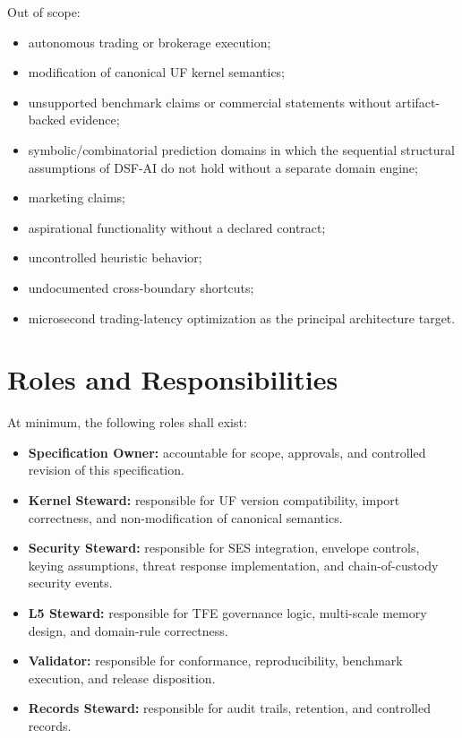 Out of scope:
\begin{itemize}
    \item autonomous trading or brokerage execution;
    \item modification of canonical UF kernel semantics;
    \item unsupported benchmark claims or commercial statements without artifact-backed evidence;
    \item symbolic/combinatorial prediction domains in which the sequential structural assumptions of DSF-AI do not hold without a separate domain engine;
    \item marketing claims;
    \item aspirational functionality without a declared contract;
    \item uncontrolled heuristic behavior;
    \item undocumented cross-boundary shortcuts;
    \item microsecond trading-latency optimization as the principal architecture target.
\end{itemize}

\section{Roles and Responsibilities}

At minimum, the following roles shall exist:
\begin{itemize}
    \item \textbf{Specification Owner:} accountable for scope, approvals, and controlled revision of this specification.
    \item \textbf{Kernel Steward:} responsible for UF version compatibility, import correctness, and non-modification of canonical semantics.
    \item \textbf{Security Steward:} responsible for SES integration, envelope controls, keying assumptions, threat response implementation, and chain-of-custody security events.
    \item \textbf{L5 Steward:} responsible for TFE governance logic, multi-scale memory design, and domain-rule correctness.
    \item \textbf{Validator:} responsible for conformance, reproducibility, benchmark execution, and release disposition.
    \item \textbf{Records Steward:} responsible for audit trails, retention, and controlled records.
\end{itemize}

